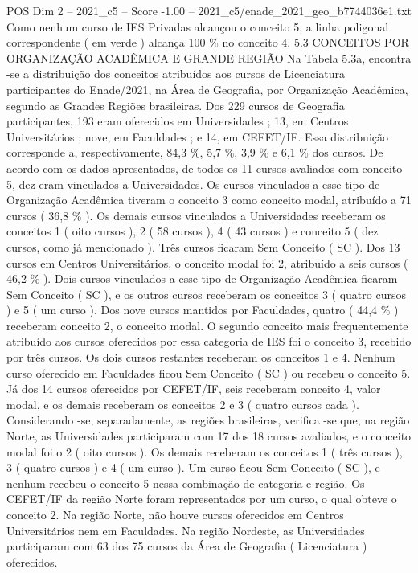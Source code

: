 \begin{textsample}{POS Dim 2 – 2021\_c5 – Score -1.00 – 2021\_c5/enade\_2021\_geo\_b7744036e1.txt}
Como nenhum curso de IES Privadas alcançou o conceito 5, a linha poligonal correspondente ( em verde ) alcança 100 \% no conceito 4. 5.3 CONCEITOS POR ORGANIZAÇÃO ACADÊMICA E GRANDE REGIÃO Na Tabela 5.3a, encontra -se a distribuição dos conceitos atribuídos aos cursos de Licenciatura participantes do Enade/2021, na Área de Geografia, por Organização Acadêmica, segundo as Grandes Regiões brasileiras.
Dos 229 cursos de Geografia participantes, 193 eram oferecidos em Universidades ; 13, em Centros Universitários ; nove, em Faculdades ; e 14, em CEFET/IF.
Essa distribuição corresponde a, respectivamente, 84,3 \%, 5,7 \%, 3,9 \% e 6,1 \% dos cursos.
De acordo com os dados apresentados, de todos os 11 cursos avaliados com conceito 5, dez eram vinculados a Universidades.
Os cursos vinculados a esse tipo de Organização Acadêmica tiveram o conceito 3 como conceito modal, atribuído a 71 cursos ( 36,8 \% ).
Os demais cursos vinculados a Universidades receberam os conceitos 1 ( oito cursos ), 2 ( 58 cursos ), 4 ( 43 cursos ) e conceito 5 ( dez cursos, como já mencionado ).
Três cursos ficaram Sem Conceito ( SC ).
Dos 13 cursos em Centros Universitários, o conceito modal foi 2, atribuído a seis cursos ( 46,2 \% ).
Dois cursos vinculados a esse tipo de Organização Acadêmica ficaram Sem Conceito ( SC ), e os outros cursos receberam os conceitos 3 ( quatro cursos ) e 5 ( um curso ).
Dos nove cursos mantidos por Faculdades, quatro ( 44,4 \% ) receberam conceito 2, o conceito modal.
O segundo conceito mais frequentemente atribuído aos cursos oferecidos por essa categoria de IES foi o conceito 3, recebido por três cursos.
Os dois cursos restantes receberam os conceitos 1 e 4.
Nenhum curso oferecido em Faculdades ficou Sem Conceito ( SC ) ou recebeu o conceito 5.
Já dos 14 cursos oferecidos por CEFET/IF, seis receberam conceito 4, valor modal, e os demais receberam os conceitos 2 e 3 ( quatro cursos cada ).
Considerando -se, separadamente, as regiões brasileiras, verifica -se que, na região Norte, as Universidades participaram com 17 dos 18 cursos avaliados, e o conceito modal foi o 2 ( oito cursos ).
Os demais receberam os conceitos 1 ( três cursos ), 3 ( quatro cursos ) e 4 ( um curso ).
Um curso ficou Sem Conceito ( SC ), e nenhum recebeu o conceito 5 nessa combinação de categoria e região.
Os CEFET/IF da região Norte foram representados por um curso, o qual obteve o conceito 2.
Na região Norte, não houve cursos oferecidos em Centros Universitários nem em Faculdades.
Na região Nordeste, as Universidades participaram com 63 dos 75 cursos da Área de Geografia ( Licenciatura ) oferecidos.

\end{textsample}
